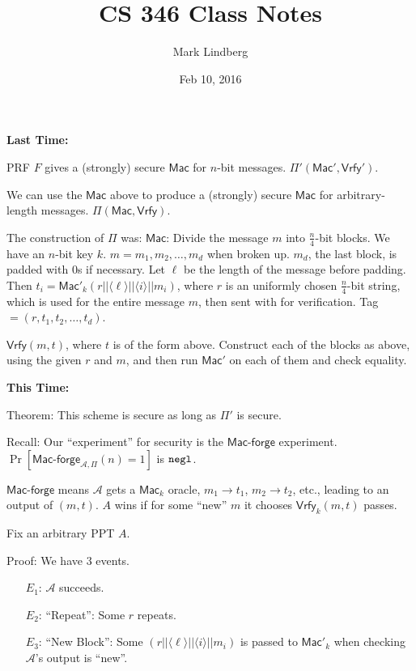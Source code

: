 \documentclass[12pt]{article}
\newcommand{\AAA}{\mathcal{A}}
\newcommand{\Mac}{\mathsf{Mac}}
\newcommand{\Macf}{\mathsf{Mac\text{-}forge}}
\newcommand{\Vrfy}{\mathsf{Vrfy}}
\newcommand{\ang}[1]{\langle#1\rangle}
\newcommand{\negl}{{\tt negl}}
\begin{document}
\title{CS 346 Class Notes}
\date{Feb 10, 2016}
\author{Mark Lindberg}
\maketitle
\thispagestyle{fancy}

{\bf Last Time:}

PRF $F$ gives a (strongly) secure $\Mac$ for $n$-bit messages. $\Pi'(\Mac',\Vrfy')$.

We can use the $\Mac$ above to produce a (strongly) secure $\Mac$ for arbitrary-length messages. $\Pi(\Mac,\Vrfy)$.

The construction of $\Pi$ was: $\Mac$: Divide the message $m$ into $\frac{n}{4}$-bit blocks. We have an $n$-bit key $k$. $m=m_1,m_2,\dots,m_d$ when broken up. $m_d$, the last block, is padded with $0$s if necessary. Let $\ell$ be the length of the message before padding. Then $t_i=\Mac'_k(r||\ang{\ell}||\ang{i}||m_i)$, where $r$ is an uniformly chosen $\frac{n}{4}$-bit string, which is used for the entire message $m$, then sent with for verification. Tag $=(r,t_1,t_2,\dots,t_d)$.

$\Vrfy(m,t)$, where $t$ is of the form above. Construct each of the blocks as above, using the given $r$ and $m$, and then run $\Mac'$ on each of them and check equality.

{\bf This Time:}

Theorem: This scheme is secure as long as $\Pi'$ is secure.

Recall: Our ``experiment'' for security is the $\Macf$ experiment. $\Pr[\Macf_{\AAA,\Pi}(n)=1]$ is $\negl$.

$\Macf$ means $\AAA$ gets a $\Mac_k$ oracle, $m_1\to t_1$, $m_2\to t_2$, etc., leading to an output of $(m,t)$. $A$ wins if for some ``new'' $m$ it chooses $\Vrfy_k(m,t)$ passes.

Fix an arbitrary PPT $A$.

Proof: We have $3$ events.\begin{itemize}

\item[$E_1$:] $\AAA$ succeeds.

\item[$E_2$:] ``Repeat'': Some $r$ repeats.

\item[$E_3$:] ``New Block'': Some $(r||\ang{\ell}||\ang{i}||m_i)$ is passed to $\Mac'_k$ when checking $\AAA$'s output is ``new''.

\end{itemize}
\end{document}
